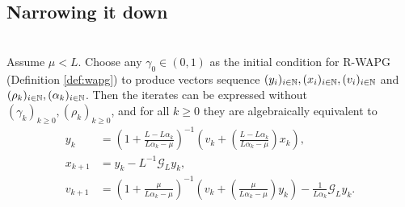 \documentclass[12pt]{article}
\begin{document}
    \subsection{Narrowing it down}
        \begin{proposition}\label{prop:wapg-first-equivalent-repr}\;\\
            Assume $\mu < L$. 
            Choose any $\gamma_0 \in (0, 1)$ as the initial condition for R-WAPG (Definition \ref{def:wapg}) to produce vectors sequence $(y_i)_{i \in \mathbb N}, (x_i)_{i \in \mathbb N}, (v_i)_{i \in \mathbb N}$ and $(\rho_k)_{i \in \mathbb N}, (\alpha_k)_{i \in \mathbb N}$. 
            Then the iterates can be expressed without $(\gamma_k)_{k \ge0}, (\rho_k)_{k\ge0}$, and for all $k\ge 0$ they are algebraically equivalent to
            \begin{align*}
                y_k &= 
                \left(
                    1 + \frac{L - L\alpha_k}{L\alpha_k - \mu}
                \right)^{-1}
                \left(
                    v_k + 
                    \left(\frac{L - L\alpha_k}{L\alpha_k - \mu} \right) x_k
                \right), 
                \\
                x_{k + 1} &= 
                y_k - L^{-1} \mathcal G_L y_k, 
                \\
                v_{k + 1} &= 
                \left(
                    1 + \frac{\mu}{L \alpha_k - \mu}
                \right)^{-1}
                \left(
                    v_k + 
                    \left(\frac{\mu}{L \alpha_k - \mu}\right) y_k
                \right) - \frac{1}{L\alpha_{k}}\mathcal G_L y_k. 
            \end{align*}
        \end{proposition}
\end{document}
